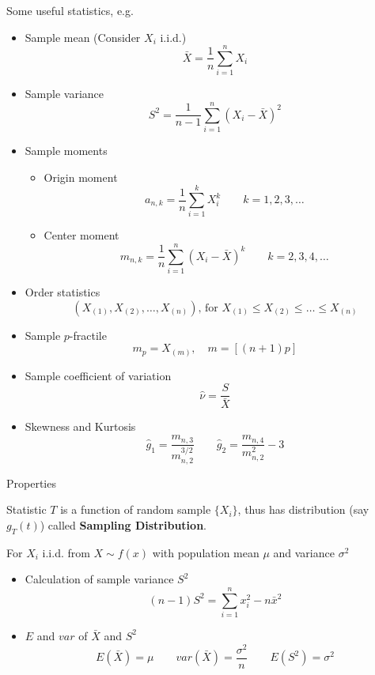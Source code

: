     Some useful statistics, e.g.
    \begin{itemize}
        \item Sample mean (Consider $X_i$ i.i.d.)
        \[
            \bar{X}=\frac{1}{n}\sum_{i=1}^n X_i
        \]
        \item Sample variance
        \[
            S^2=\frac{1}{n-1}\sum_{i=1}^n(X_i-\bar{X})^2  
        \]
        \item Sample moments
        \begin{itemize}
            \item Origin moment
            \[
                a_{n,k}=\frac{1}{n}\sum_{i=1}^k X_i^k\qquad k=1,2,3,\ldots    
            \]
            \item Center moment
            \[
                m_{n,k}=\frac{1}{n}\sum_{i=1}^n (X_i-\bar{X})^k\qquad k=2,3,4,\ldots    
            \]
        \end{itemize}
        \item Order statistics
        \[
            (X_{(1)},X_{(2)},\ldots,X_{(n)}),\,\text{for }X_{(1)}\leq X_{(2)} \leq \ldots\leq X_{(n)}    
        \]
        \item Sample $p$-fractile
        \[
            m_p=X_{(m)},\quad m=[(n+1)p]   
        \]
        \item Sample coefficient of variation
        \[
            \hat{\nu}=\frac{S}{\bar{X}}    
        \]
        \item Skewness and Kurtosis
        \[
            \hat{g}_1=\frac{m_{n,3}}{m_{n,2}^{3/2}}\qquad \hat{g}_2=\frac{m_{n,4}}{m_{n,2}^2}    -3
        \]
    \end{itemize}

    \begin{point}
        Properties
    \end{point}
    
        

    Statistic $T$ is a function of random sample $\{X_i\}$, thus has distribution (say $g_T(t)$) called \textbf{Sampling Distribution}.

        For $X_i$ i.i.d. from $X\sim f(x)$ with population mean $\mu$ and variance $\sigma^2$
    \begin{itemize}
        \item Calculation of sample variance $S^2$
        \[(n-1)S^2=\sum_{i=1}^n x_i^2-n\bar{x}^2\]
        \item $E$ and $var$ of $\bar{X}$ and $S^2$
        \[E(\bar{X})=\mu\qquad var(\bar{X})=\frac{\sigma^2}{n}\qquad E(S^2)=\sigma^2\]
    \end{itemize}

